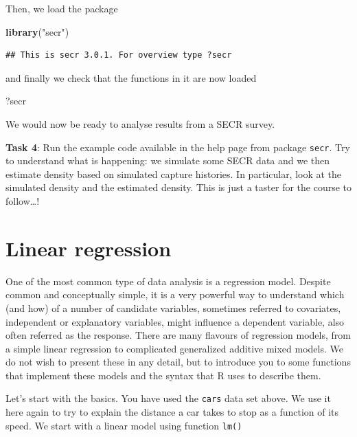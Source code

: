 \documentclass[]{book}
\newenvironment{Shaded}{\begin{snugshade}}{\end{snugshade}}
\newcommand{\KeywordTok}[1]{\textcolor[rgb]{0.13,0.29,0.53}{\textbf{#1}}}
\newcommand{\StringTok}[1]{\textcolor[rgb]{0.31,0.60,0.02}{#1}}
\newcommand{\NormalTok}[1]{#1}
\theoremstyle{definition}
\theoremstyle{definition}
\theoremstyle{remark}
\begin{document}
Then, we load the package

\begin{Shaded}
\begin{Highlighting}[]
\KeywordTok{library}\NormalTok{(}\StringTok{"secr"}\NormalTok{)}
\end{Highlighting}
\end{Shaded}

\begin{verbatim}
## This is secr 3.0.1. For overview type ?secr
\end{verbatim}

and finally we check that the functions in it are now loaded

\begin{Shaded}
\begin{Highlighting}[]
\NormalTok{?secr}
\end{Highlighting}
\end{Shaded}

We would now be ready to analyse results from a SECR survey.

\textbf{Task 4}: Run the example code available in the help page from
package \texttt{secr}. Try to understand what is happening: we simulate
some SECR data and we then estimate density based on simulated capture
histories. In particular, look at the simulated density and the
estimated density. This is just a taster for the course to
follow\ldots{}!

\section{Linear regression}\label{linear-regression}

One of the most common type of data analysis is a regression model.
Despite common and conceptually simple, it is a very powerful way to
understand which (and how) of a number of candidate variables, sometimes
referred to covariates, independent or explanatory variables, might
influence a dependent variable, also often referred as the response.
There are many flavours of regression models, from a simple linear
regression to complicated generalized additive mixed models. We do not
wish to present these in any detail, but to introduce you to some
functions that implement these models and the syntax that R uses to
describe them.

Let's start with the basics. You have used the \texttt{cars} data set
above. We use it here again to try to explain the distance a car takes
to stop as a function of its speed. We start with a linear model using
function \texttt{lm()}
\end{document}
